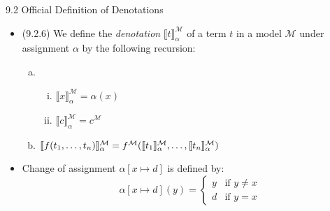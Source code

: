 \begin{frame}{9.2 Official Definition of Denotations}

	\begin{itemize}%
	\itemsep=16pt
					
		\item (9.2.6) We define the \emph{denotation} $\llbracket t\rrbracket_\alpha^\mathcal{M}$ of a term $t$ in a model $\mathcal{M}$ under assignment $\alpha$ by the following recursion:
		
			\begin{enumerate}[(a)]
			
				\item		\begin{enumerate}[(i)]

					\item $\llbracket x\rrbracket_\alpha^\mathcal{M}=\alpha(x)$
					\item $\llbracket c\rrbracket_\alpha^\mathcal{M}=c^\mathcal{M}$
				
				\end{enumerate}
				
				\item $\llbracket f(t_1,\mathellipsis,t_n)\rrbracket_\alpha^\mathcal{M}=f^\mathcal{M}(\llbracket t_1\rrbracket_\alpha^\mathcal{M}, \mathellipsis, \llbracket t_n\rrbracket_\alpha^\mathcal{M})$
			
			\end{enumerate}
			
			\item Change of assignment $\alpha[x\mapsto d]$ is defined by:
		\[\alpha[x\mapsto d](y)=\begin{cases} y &\text{if }y\neq x\\ d & \text{if }y=x\end{cases}\]		

	
	\end{itemize}

\end{frame}

